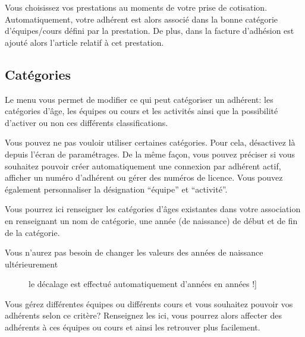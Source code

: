 \documentclass[a4paper,10pt,oneside,french]{sphinxmanual}
\begin{document}
Vous choisissez vos prestations au moments de votre prise de cotisation.
Automatiquement, votre adhérent est alors associé dans la bonne catégorie d’équipes/cours défini par la prestation.
De plus, dans la facture d’adhésion est ajouté alors l’article relatif à cet prestation.


\subsection{Catégories}
\label{\detokenize{member/config:categories}}
Le menu  vous permet de modifier ce qui peut catégoriser un adhérent: les catégories d’âge, les équipes ou cours et les activités ainsi que la possibilité d’activer ou non ces différents classifications.

Vous pouvez ne pas vouloir utiliser certaines catégories. Pour cela, désactivez là depuis l’écran de paramétrages.
De la même façon, vous pouvez préciser si vous souhaitez pouvoir créer automatiquement une connexion par adhérent actif, afficher un numéro d’adhérent ou gérer des numéros de licence.
Vous pouvez également personnaliser la désignation “équipe” et “activité”.
\begin{quote}

\noindent{}
\end{quote}


Vous pourrez ici renseigner les catégories d’âges existantes dans votre association en renseignant un nom de catégorie, une année (de naissance) de début et de fin de la catégorie.
\begin{description}
\item[{Vous n’aurez pas besoin de changer les valeurs des années de naissance ultérieurement}] \leavevmode{[}le décalage est effectué automatiquement d’années en années !{]}
\noindent{}

\end{description}

\begin{description}
\item[{Vous gérez différentes équipes ou différents cours et vous souhaitez pouvoir vos adhérents selon ce critère? Renseignez les ici, vous pourrez alors affecter des adhérents à ces équipes ou cours et ainsi les retrouver plus facilement.}] \leavevmode
\noindent{}

\end{description}
\end{document}
